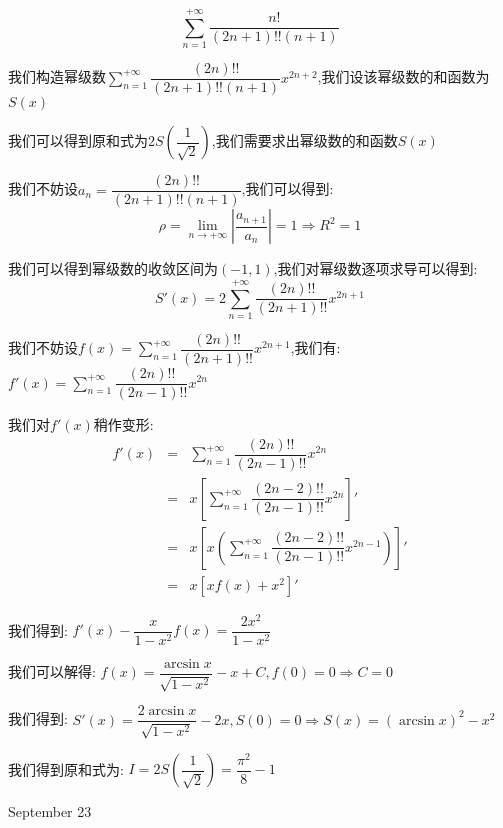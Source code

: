 \begin{example}[][Exam: 35.4.2]
	$$\sum\limits_{n=1}^{+\infty}\dfrac{n!}{(2n+1)!!(n+1)}$$
\end{example}

\begin{solution}

	我们构造幂级数$\sum\limits_{n=1}^{+\infty}\dfrac{(2n)!!}{(2n+1)!!(n+1)}x^{2n+2}$,我们设该幂级数的和函数为$S(x)$
	
	我们可以得到原和式为$2S(\dfrac{1}{\sqrt{2}})$,我们需要求出幂级数的和函数$S(x)$
	
	我们不妨设$a_{n}=\dfrac{(2n)!!}{(2n+1)!!(n+1)}$,我们可以得到:  
	$$\rho=\lim\limits_{n\to +\infty}|\dfrac{a_{n+1}}{a_{n}}|=1\Rightarrow R^2=1$$
	
	我们可以得到幂级数的收敛区间为$(-1,1)$,我们对幂级数逐项求导可以得到:  
	$$S'(x)=2\sum\limits_{n=1}^{+\infty}\dfrac{(2n)!!}{(2n+1)!!}x^{2n+1}$$
	
	我们不妨设$f(x)=\sum\limits_{n=1}^{+\infty}\dfrac{(2n)!!}{(2n+1)!!}x^{2n+1}$,我们有:  $f'(x)=\sum\limits_{n=1}^{+\infty}\dfrac{(2n)!!}{(2n-1)!!}x^{2n}$
	
	我们对$f'(x)$稍作变形:  
	\begin{eqnarray*}
		f'(x)&=&\sum\limits_{n=1}^{+\infty}\dfrac{(2n)!!}{(2n-1)!!}x^{2n}\\
		&=&x\left[\sum\limits_{n=1}^{+\infty}\dfrac{(2n-2)!!}{(2n-1)!!}x^{2n} \right]'\\
		&=&x\left[ x\left(\sum\limits_{n=1}^{+\infty}\dfrac{(2n-2)!!}{(2n-1)!!}x^{2n-1} \right) \right]'\\
		&=&x\left[ xf(x)+x^2\right]'   
	\end{eqnarray*}

	我们得到:  $f'(x)-\dfrac{x}{1-x^2}f(x)=\dfrac{2x^2}{1-x^2}$
	
	我们可以解得:  $f(x)=\dfrac{\arcsin x}{\sqrt{1-x^2}}-x+C,f(0)=0\Rightarrow C=0$
	
	我们得到:  $S'(x)=\dfrac{2\arcsin x}{\sqrt{1-x^2}}-2x,S(0)=0\Rightarrow S(x)=(\arcsin x)^2-x^2$
	
	我们得到原和式为:  $I=2S(\dfrac{1}{\sqrt{2}})=\dfrac{\pi^2}{8}-1$
\end{solution}


\textcolor{purplea}{September 23}

